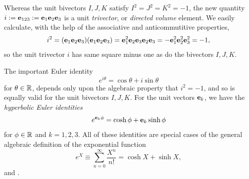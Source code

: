 \documentclass[]{article}
\begin{document}
Whereas the unit bivectors $I,J,K$ satisfy $I^2=J^2=K^2 = -1$, the new quantity
$i:= \mathbf{e}_{123}:=\mathbf{e}_1 \mathbf{e}_2 \mathbf{e}_3$ is a unit {\it trivector}, or {\it directed
volume} element. We easily calculate, with the help of the associative and anticommutitive properties, 
\[ i^2 = (\mathbf{e}_1 \mathbf{e}_2 \mathbf{e}_3)(\mathbf{e}_1 \mathbf{e}_2 \mathbf{e}_3) =\mathbf{e}_1^2 \mathbf{e}_2 \mathbf{e}_3 \mathbf{e}_2 \mathbf{e}_3 =- \mathbf{e}_1^2 \mathbf{e}_2^2 \mathbf{e}_3^2
 = -1,\]
so the unit trivector $i$ has same square minus one as do the bivectors $I,J,K$.

The important Euler identity
 \[ e^{i \theta}=\cos \theta + i \sin \theta  \]
 for $\theta \in \mathbb{R}$, depends only upon
 the algebraic property that $i^2=-1$, and so is equally
 valid for the unit bivectors $I,J,K$.
 For the unit vectors $\mathbf{e}_k$, we have the {\it hyperbolic Euler identities} 
\[ e^{\mathbf{e}_k \phi}=\cosh \phi + \mathbf{e}_k \sinh \phi  \]
for $\phi \in \mathbb{R}$ and $k=1,2,3$.
All of these identities are special cases of the general algebraic definition of the exponential function
\[  e^X\equiv \sum_{n=0}^\infty \frac{X^n}{n!}= \cosh X + \sinh X, \]
\cite[Chp. 2]{SNF} and \cite{S1}.
\end{document}
